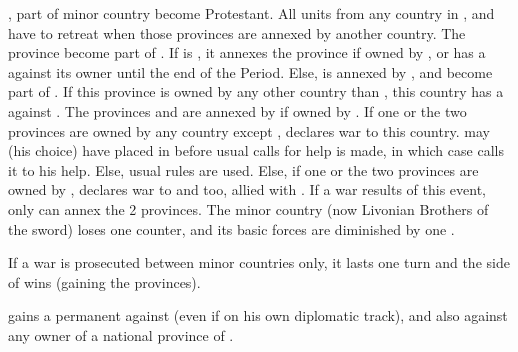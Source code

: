 

\phevnt
\aparag {}, part of minor country  become
Protestant.  All units from any country in \provincePreussen,  and  have to retreat when those provinces
are annexed by another country.
\aparag The province \provincePreussen become part of .
\bparag If \POL is \CATHCO, it annexes the province if owned by
, or has a \CB against its owner until the end of the
Period.
\bparag Else,  is annexed by \paysBrandebourg, and
\provincePreussen become part of \paysBrandebourg. If this province is owned
by any other country than , this country has a \CB against
\paysBrandebourg.
\aparag The provinces  and  are
annexed by \paysHanse if owned by .
\bparag If one or the two provinces are owned by any country except \POL,
\paysHanse declares war to this country. \POL may (his choice) have \paysHanse
placed in \AM before usual calls for help is made, in which case \paysHanse
calls it to his help. Else, usual rules are used.
\bparag Else, if one or the two provinces are owned by \POL, \paysHanse
declares war to \POL and \paysBrandebourg too, allied with \paysHanse.
\bparag If a war results of this event, only \paysHanse can annex the 2
provinces.
\aparag The minor country  (now Livonian Brothers of the
sword) loses one \ARMY counter, and its basic forces are diminished by one
\ARMY\faceplus.

\phpaix
\aparag If a war is prosecuted between minor countries only, it lasts one turn
and the side of \paysBrandebourg wins (gaining the provinces).






\phevnt
\aparag \SPA gains a permanent \CB against \paysNaples (even if on his own
diplomatic track), and also against any owner of a national province of
\paysNaples.

